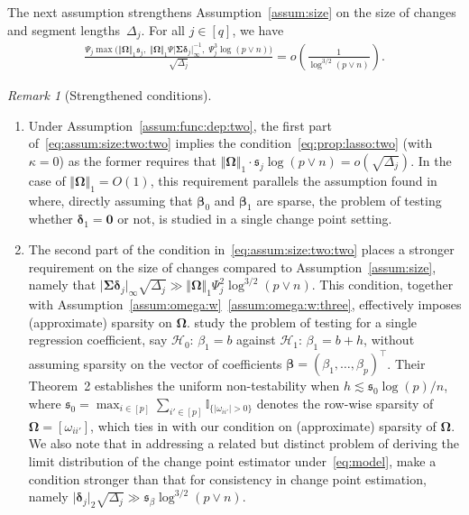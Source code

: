 \documentclass[11pt, a4paper]{article}
\newcommand{\mbf}{\mathbf}
\newcommand{\mc}{\mathcal}
\renewcommand{\l}{\left}
\renewcommand{\r}{\right}
\theoremstyle{definition}
\theoremstyle{definition}
\theoremstyle{definition}
\theoremstyle{definition}
\theoremstyle{definition}
\theoremstyle{remark}
\newtheorem{rem}{Remark}[section]
\theoremstyle{definition}
\theoremstyle{definition}
\theoremstyle{definition}
\newenvironment{massum}[1]{%
  \renewcommand\themassuminner{#1}%
  \massuminner
}{\endmassuminner}
\begin{document}
The next assumption strengthens Assumption~\ref{assum:size} on the size of changes and segment lengths~$\Delta_j$.
\begin{massum}{\ref{assum:size}$^\prime$}[Sample size and sparsity]
	\label{assum:size:two} For all $j \in [q]$, we have
	\begin{align}
	\frac{\Psi_j \max\bigl( \Vert \bm\Omega \Vert_1 \mathfrak{s}_j, \; \Vert \bm\Omega \Vert_1 \Psi \vert \bm\Sigma \bm\delta_j \vert_\infty^{-1}, \; \Psi_j^3 \log(p \vee n) \bigr) } {\sqrt{\Delta_j}} = o\l(\frac{1}{\log^{3/2}(p \vee n)}\r). 
\label{eq:assum:size:two:two} 
\end{align}
\end{massum}

\begin{rem}[Strengthened conditions]
	\label{rem:inference}
	\begin{enumerate}[label = (\roman*)]
		\item 
Under Assumption~\ref{assum:func:dep:two}, the first part of~\eqref{eq:assum:size:two:two} implies the condition~\eqref{eq:prop:lasso:two} (with $\kappa = 0$) as the former requires that $\Vert \bm\Omega \Vert_1 \cdot \mathfrak{s}_j \log(p \vee n) = o(\sqrt{\Delta_j})$.
In the case of $\Vert \bm\Omega \Vert_1 = O(1)$, this requirement parallels the assumption found in 
\cite{liu2024simultaneous} where, directly assuming that $\bm\beta_0$ and $\bm\beta_1$ are sparse, the problem of testing whether $\bm\delta_1 = \mbf 0$ or not, is studied in a single change point setting.
		
		\item 
The second part of the condition in~\eqref{eq:assum:size:two:two} places a stronger requirement on the size of changes compared to Assumption~\ref{assum:size}, namely that $\vert \bm\Sigma \bm\delta_j \vert_\infty \sqrt{\Delta_j} \gg \Vert \bm\Omega \Vert_1 \Psi_j^2 \log^{3/2}(p \vee n)$.
This condition, together with Assumption~\ref{assum:omega:w}~\ref{assum:omega:w:three}, effectively imposes (approximate) sparsity on $\bm\Omega$.
\cite{bradic2022testability} study the problem of testing for a single regression coefficient, say $\mc H_0: \, \beta_1 = b$ against $\mc H_1: \, \beta_1 = b + h$, without assuming sparsity on the vector of coefficients $\bm\beta = (\beta_1, \ldots, \beta_p)^\top$. 
Their Theorem~2 establishes the uniform non-testability when $h \lesssim \mathfrak{s}_0 \log(p) / n$, 
where $\mathfrak{s}_0 = \max_{i \in [p]} \sum_{i' \in [p]} \mathbb{I}_{\{\vert \omega_{ii'} \vert > 0\}}$ denotes the row-wise sparsity of $\bm\Omega = [\omega_{ii'}]$, which ties in with our condition on (approximate) sparsity of $\bm\Omega$.
We also note that in addressing a related but distinct problem of deriving the limit distribution of the change point estimator under~\eqref{eq:model}, \cite{xu2022change} make a condition stronger than that for consistency in change point estimation, namely $\vert \bm\delta_j \vert_2 \sqrt{\Delta_j} \gg \mathfrak{s}_\beta \log^{3/2}(p \vee n)$.
\end{enumerate}
\end{rem}
\end{document}
